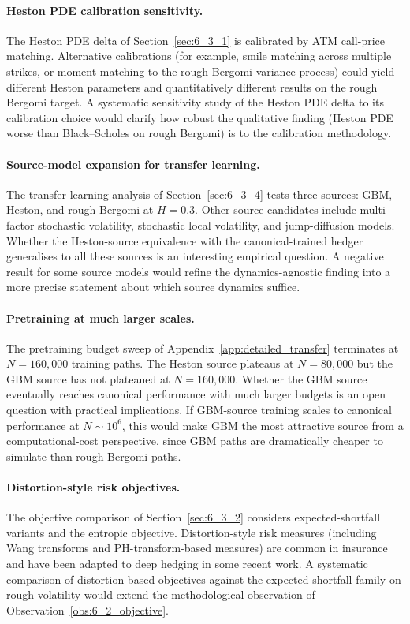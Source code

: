 \documentclass[12pt,a4paper]{article}
\theoremstyle{definition}
\theoremstyle{plain}
\theoremstyle{remark}
\theoremstyle{plain}
\begin{document}
\paragraph{Heston PDE calibration sensitivity.}
The Heston PDE delta of Section~\ref{sec:6_3_1} is calibrated by
ATM call-price matching. Alternative calibrations (for example,
smile matching across multiple strikes, or moment matching to the
rough Bergomi variance process) could yield different Heston
parameters and quantitatively different results on the rough Bergomi
target. A systematic sensitivity study of the Heston PDE delta to
its calibration choice would clarify how robust the qualitative
finding (Heston PDE worse than Black--Scholes on rough Bergomi) is
to the calibration methodology.

\paragraph{Source-model expansion for transfer learning.}
The transfer-learning analysis of Section~\ref{sec:6_3_4} tests
three sources: GBM, Heston, and rough Bergomi at $H = 0.3$. Other
source candidates include multi-factor stochastic volatility,
stochastic local volatility, and jump-diffusion models. Whether the
Heston-source equivalence with the canonical-trained hedger
generalises to all these sources is an interesting empirical
question. A negative result for some source models would refine the
dynamics-agnostic finding into a more precise statement about which
source dynamics suffice.

\paragraph{Pretraining at much larger scales.}
The pretraining budget sweep of
Appendix~\ref{app:detailed_transfer} terminates at $N = 160{,}000$
training paths. The Heston source plateaus at $N = 80{,}000$ but
the GBM source has not plateaued at $N = 160{,}000$. Whether the
GBM source eventually reaches canonical performance with much
larger budgets is an open question with practical implications. If
GBM-source training scales to canonical performance at $N \sim 10^6$,
this would make GBM the most attractive source from a
computational-cost perspective, since GBM paths are dramatically
cheaper to simulate than rough Bergomi paths.

\paragraph{Distortion-style risk objectives.}
The objective comparison of Section~\ref{sec:6_3_2} considers
expected-shortfall variants and the entropic objective.
Distortion-style risk measures (including Wang transforms and
PH-transform-based measures) are common in insurance and have been
adapted to deep hedging in some recent work. A systematic comparison
of distortion-based objectives against the expected-shortfall family
on rough volatility would extend the methodological observation of
Observation~\ref{obs:6_2_objective}.
\end{document}
